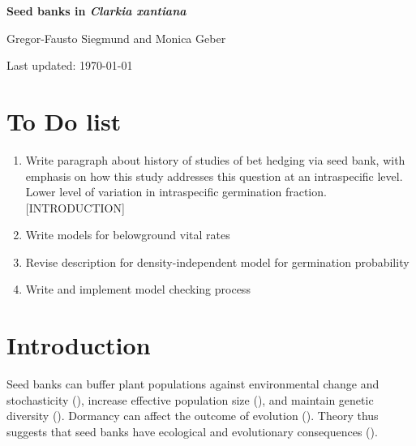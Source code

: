 \documentclass[12pt, oneside, titlepage]{article}   	%
\begin{document}
\begin{titlepage}
   \begin{center}
       \vspace*{1cm}
 
       \textbf{Seed banks in \textit{Clarkia xantiana}}
 
       \vspace{1.5cm}
 
       Gregor-Fausto Siegmund and Monica Geber
 
   	Last updated: \today
	
	\section*{To Do list}
	
	\begin{enumerate}
	
	\item Write paragraph about history of studies of bet hedging via seed bank, with emphasis on how this study addresses this question at an intraspecific level. Lower level of variation in intraspecific germination fraction. [INTRODUCTION]
	\item Write models for belowground vital rates
	\item Revise description for density-independent model for germination probability
	\item Write and implement model checking process
	
	\end{enumerate}
 
   \end{center}
\end{titlepage}
%

\section*{Introduction}

Seed banks can buffer plant populations against environmental change and stochasticity (\cite{eager2014,paniw2017}), increase effective population size (\cite{nunney2002,waples2006}), and maintain genetic diversity (\cite{mccue1998b}). Dormancy can affect the outcome of evolution (\cite{ritland1983,heinrich2018}). Theory thus suggests that seed banks have ecological and evolutionary consequences (\cite{evans2005}). 
\end{document}
